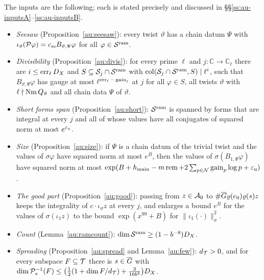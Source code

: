 \documentclass[10pt]{amsart}
\theoremstyle{definition}
\theoremstyle{remark}
\newcommand{\C}{\mathbb C}
\begin{document}
The inputs are the following; each is stated precisely and discussed in
\S\S\ref{ss:au-inputsA}--\ref{ss:au-inputsB}.
\begin{itemize}
\item[(I1)] \emph{Seesaw} (Proposition~\ref{au:seesaw}): every twist $\vartheta$ has a chain datum
$\Psi$ with $\iota_\vartheta(\mathcal P\varphi)=c_{\mathrm{ss}}B_{\vartheta,\Psi}\varphi$ for all
$\varphi\in\mathcal S^{\mathrm{ram}}$.
\item[(I2)] \emph{Divisibility} (Proposition~\ref{au:divis}): for every prime $\ell$ and
$j\colon\C\to\C_\ell$ there are $i\le\operatorname{err}_\ell D_X$ and $S\subseteq\mathcal S_j\cap\mathcal S^{\mathrm{ram}}$ with
$\operatorname{col}(\mathcal S_j\cap\mathcal S^{\mathrm{ram}},S)\mid\ell^i$, such that $B_{\vartheta,\Psi}\varphi$ has gauge at most
$\ell^{\operatorname{err}_\ell-\operatorname{gain}_\ell}$ at $j$ for all $\varphi\in S$, all twists $\vartheta$ with
$\ell\nmid\operatorname{Nm} Q_\vartheta$ and all chain data $\Psi$ of $\vartheta$.
\item[(I3)] \emph{Short forms span} (Proposition~\ref{au:short}): $\mathcal S^{\mathrm{ram}}$ is spanned by forms
that are integral at every $j$ and all of whose values have all conjugates of squared norm at most
$e^{\varepsilon_{\mathrm u}}$.
\item[(I4)] \emph{Size} (Proposition~\ref{au:size}): if $\Psi$ is a chain datum of the trivial
twist and the values of $\sigma\varphi$ have squared norm at most $e^B$, then the values of
$\sigma(B_{1,\Psi}\varphi)$ have squared norm at most $\exp(B+h_{\mathrm{main}}-m\operatorname{rem}+2\sum_{p\in
\mathcal N}\operatorname{gain}_p\log p+\varepsilon_{\mathrm u})$.
\item[(I5)] \emph{The good part} (Proposition~\ref{au:good}): passing from $z\in\mathcal A_0$ to
$\#\overline G\varrho(e_0)\varrho(s)z$ keeps the integrality of $c\cdot\iota_\vartheta z$ at every $j$,
and enlarges a bound $e^B$ for the values of $\sigma(\iota_1z)$ to the bound $\exp(x^{99}+B)$ for
$\|\iota_1(\cdot)\|_\sigma^2$.
\item[(I6)] \emph{Count} (Lemma~\ref{au:ramcount}): $\dim\mathcal S^{\mathrm{ram}}\ge(1-b^{-8})D_X$.
\item[(I7)] \emph{Spreading} (Proposition~\ref{au:spread} and Lemma~\ref{au:few}): $d_{\mathcal T}>0$, and
for every subspace $F\subseteq\mathcal T$ there is $s\in\overline G$ with
$\dim\mathcal P_s^{-1}(F)\le\bigl(\tfrac12(1+\dim F/d_{\mathcal T})+\tfrac3{16b^2}\bigr)D_X$.
\end{itemize}
\end{document}

